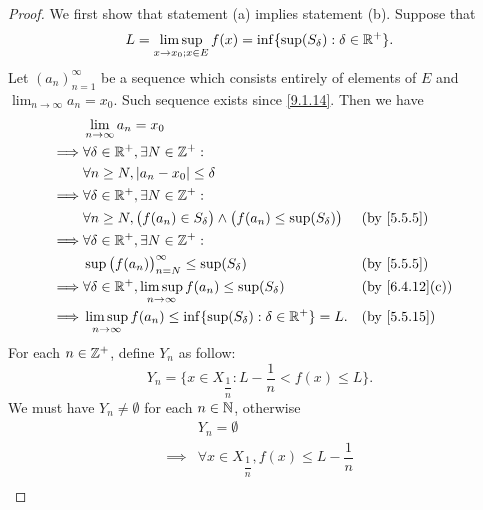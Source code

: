 \begin{proof}
  We first show that statement (a) implies statement (b).
  Suppose that
  \[
    L = \limsup_{x \to x_0 ; x \in E} f(x) = \inf\{\sup(S_\delta) : \delta \in \mathbb{R}^+\}.
  \]
  Let \((a_n)_{n = 1}^\infty\) be a sequence which consists entirely of elements of \(E\) and \(\lim_{n \to \infty} a_n = x_0\).
  Such sequence exists since \cref{9.1.14}.
  Then we have
  \begin{align*}
             & \lim_{n \to \infty} a_n = x_0                                                                                                    \\
    \implies & \forall \delta \in \R^+, \exists N \in \Z^+ :                                                                                    \\
             & \forall n \geq N, \abs{a_n - x_0} \leq \delta                                                                                    \\
    \implies & \forall \delta \in \R^+, \exists N \in \Z^+ :                                                                                    \\
             & \forall n \geq N, \big(f(a_n) \in S_{\delta}\big) \land \big(f(a_n) \leq \sup(S_{\delta})\big) &  & \by{5.5.5}                   \\
    \implies & \forall \delta \in \R^+, \exists N \in \Z^+ :                                                                                    \\
             & \sup\big(f(a_n)\big)_{n = N}^\infty \leq \sup(S_{\delta})                                      &  & \by{5.5.5}                   \\
    \implies & \forall \delta \in \R^+, \limsup_{n \to \infty} f(a_n) \leq \sup(S_{\delta})                   &  & \text{(by \cref{6.4.12}(c))} \\
    \implies & \limsup_{n \to \infty} f(a_n) \leq \inf\{\sup(S_{\delta}) : \delta \in \R^+\} = L.             &  & \by{5.5.15}
  \end{align*}
  For each \(n \in \mathbb{Z}^+\), define \(Y_n\) as follow:
  \[
    Y_n = \{x \in X_{\dfrac{1}{n}} : L - \dfrac{1}{n} < f(x) \leq L\}.
  \]
  We must have \(Y_n \neq \emptyset\) for each \(n \in \mathbb{N}\), otherwise
  \begin{align*}
             & Y_n = \emptyset                                                                                   \\
    \implies & \forall x \in X_{\dfrac{1}{n}}, f(x) \leq L - \dfrac{1}{n}                                        \\

\end{align*}
\end{proof}

